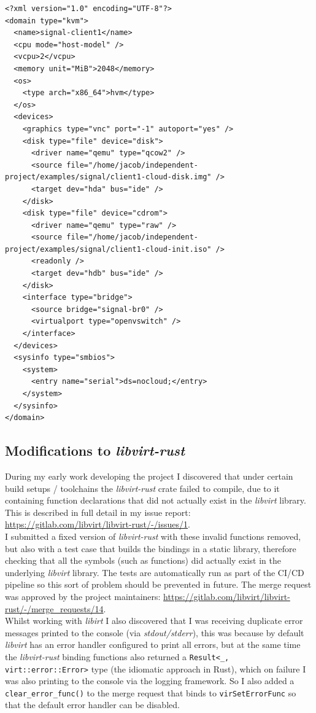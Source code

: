 \documentclass[
    author={Jacob Daniel Halsey},
    supervisor={Prof. Awais Rashid},
    degree={BSc},
    title={Building a Testbed for Evaluating Privacy Enhancing Technologies  (PETs)},
    subtitle={},
    type={software development},
    year={2021}
]{dissertation}
\begin{document}
\begin{verbatim}
<?xml version="1.0" encoding="UTF-8"?>
<domain type="kvm">
  <name>signal-client1</name>
  <cpu mode="host-model" />
  <vcpu>2</vcpu>
  <memory unit="MiB">2048</memory>
  <os>
    <type arch="x86_64">hvm</type>
  </os>
  <devices>
    <graphics type="vnc" port="-1" autoport="yes" />
    <disk type="file" device="disk">
      <driver name="qemu" type="qcow2" />
      <source file="/home/jacob/independent-project/examples/signal/client1-cloud-disk.img" />
      <target dev="hda" bus="ide" />
    </disk>
    <disk type="file" device="cdrom">
      <driver name="qemu" type="raw" />
      <source file="/home/jacob/independent-project/examples/signal/client1-cloud-init.iso" />
      <readonly />
      <target dev="hdb" bus="ide" />
    </disk>
    <interface type="bridge">
      <source bridge="signal-br0" />
      <virtualport type="openvswitch" />
    </interface>
  </devices>
  <sysinfo type="smbios">
    <system>
      <entry name="serial">ds=nocloud;</entry>
    </system>
  </sysinfo>
</domain>
\end{verbatim}

\subsection{Modifications to \emph{libvirt-rust}}

During my early work developing the project I discovered that under certain build setups / toolchains
the \emph{libvirt-rust} crate
failed to compile, due to it containing function declarations that did not actually exist in the \emph{libvirt}
library. This is described in full detail in my issue
report: \url{https://gitlab.com/libvirt/libvirt-rust/-/issues/1}.\\

I submitted a fixed version of \emph{libvirt-rust} with these invalid functions removed, but also with
a test case that builds the bindings in a static library, therefore checking that all the symbols (such as
functions) did actually exist in the underlying \emph{libvirt} library. 
The tests are automatically run as part of the 
CI/CD pipeline so this sort of problem should be prevented in future. The merge request was approved by
the project maintainers: \url{https://gitlab.com/libvirt/libvirt-rust/-/merge_requests/14}. \\

Whilst working with \emph{libirt} I also discovered that I was receiving duplicate error messages printed
to the console (via \emph{stdout/stderr}), this was because by default \emph{libvirt} has an error handler
configured to print all errors, but at the same time the \emph{libvirt-rust} binding functions also returned
a \lstinline|Result<_, virt::error::Error>| type (the idiomatic approach in Rust), 
which on failure I was also printing to the console
via the logging framework. So I also added a \lstinline|clear_error_func()| to the merge request
that binds to \lstinline|virSetErrorFunc| so that the default error handler can be disabled.
\end{document}
